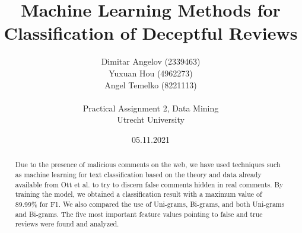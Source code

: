 \documentclass[a4paper, 11pt]{article}
\title{\vspace{-25mm} Machine Learning Methods for Classification of Deceptful Reviews}
\author{ Dimitar Angelov (2339463)\\Yuxuan Hou (4962273)\\Angel Temelko (8221113)\\\\ Practical Assignment 2, Data Mining\\ Utrecht University \vspace{-3.6mm}}
\date{05.11.2021}
\begin{document}
	\maketitle
	\vspace{-6mm}
	
	\begin{abstract}
		\noindent
		Due to the presence of malicious comments on the web, we have used techniques such as machine learning for text classification based on the theory and data already available from Ott et al. to try to discern false comments hidden in real comments. By training the model, we obtained a classification result with a maximum value of 89.99\% for F1. We also compared the use of Uni-grams, Bi-grams, and both Uni-grams and Bi-grams. The five most important feature values pointing to false and true reviews were found and analyzed.
	\end{abstract}
\end{document}
